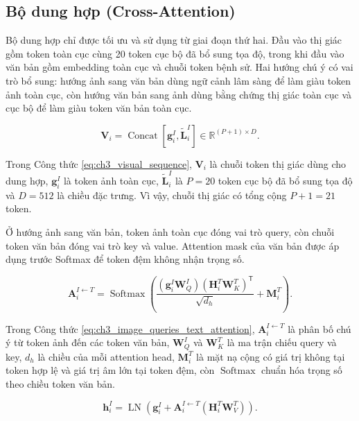 \subsection{Bộ dung hợp (Cross-Attention)}

Bộ dung hợp chỉ được tối ưu và sử dụng từ giai đoạn thứ hai. Đầu vào thị giác gồm token toàn cục cùng 20 token cục bộ đã bổ sung tọa độ, trong khi đầu vào văn bản gồm embedding toàn cục và chuỗi token bệnh sử. Hai hướng chú ý có vai trò bổ sung: hướng ảnh sang văn bản dùng ngữ cảnh lâm sàng để làm giàu token ảnh toàn cục, còn hướng văn bản sang ảnh dùng bằng chứng thị giác toàn cục và cục bộ để làm giàu token văn bản toàn cục.

\begin{equation}\boldsymbol{V}_{i}=\operatorname{Concat}\left[\boldsymbol{g}_{i}^{I},\widetilde{\boldsymbol{L}}_{i}^{I}\right]\in\mathbb{R}^{(P+1)\times D}.\label{eq:ch3_visual_sequence}\end{equation}

Trong Công thức \ref{eq:ch3_visual_sequence}, $\boldsymbol{V}_{i}$ là chuỗi token thị giác dùng cho dung hợp, $\boldsymbol{g}_{i}^{I}$ là token ảnh toàn cục, $\widetilde{\boldsymbol{L}}_{i}^{I}$ là $P=20$ token cục bộ đã bổ sung tọa độ và $D=512$ là chiều đặc trưng. Vì vậy, chuỗi thị giác có tổng cộng $P+1=21$ token.

Ở hướng ảnh sang văn bản, token ảnh toàn cục đóng vai trò query, còn chuỗi token văn bản đóng vai trò key và value. Attention mask của văn bản được áp dụng trước Softmax để token đệm không nhận trọng số.

\begin{equation}\boldsymbol{A}_{i}^{I\leftarrow T}=\operatorname{Softmax}\left(\frac{\left(\boldsymbol{g}_{i}^{I}\boldsymbol{W}_{Q}^{I}\right)\left(\boldsymbol{H}_{i}^{T}\boldsymbol{W}_{K}^{T}\right)^{\mathsf{T}}}{\sqrt{d_{h}}}+\boldsymbol{M}_{i}^{T}\right).\label{eq:ch3_image_queries_text_attention}\end{equation}

Trong Công thức \ref{eq:ch3_image_queries_text_attention}, $\boldsymbol{A}_{i}^{I\leftarrow T}$ là phân bố chú ý từ token ảnh đến các token văn bản, $\boldsymbol{W}_{Q}^{I}$ và $\boldsymbol{W}_{K}^{T}$ là ma trận chiếu query và key, $d_h$ là chiều của mỗi attention head, $\boldsymbol{M}_{i}^{T}$ là mặt nạ cộng có giá trị không tại token hợp lệ và giá trị âm lớn tại token đệm, còn $\operatorname{Softmax}$ chuẩn hóa trọng số theo chiều token văn bản.

\begin{equation}\boldsymbol{h}_{i}^{I}=\operatorname{LN}\left(\boldsymbol{g}_{i}^{I}+\boldsymbol{A}_{i}^{I\leftarrow T}\left(\boldsymbol{H}_{i}^{T}\boldsymbol{W}_{V}^{T}\right)\right).\label{eq:ch3_text_enhanced_image}\end{equation}

